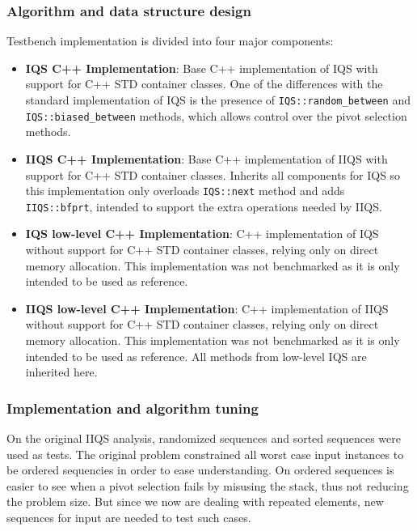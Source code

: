 \subsubsection{Algorithm and data structure design}
Testbench implementation is divided into four major components:

\begin{itemize}
    \item{
        \textbf{IQS C++ Implementation}: Base C++ implementation of IQS with support for C++ STD container classes. One of the differences with the standard implementation of IQS is the presence of \texttt{IQS::random\_between} and \texttt{IQS::biased\_between} methods, which allows control over the pivot selection methods.
    }
    \item{
        \textbf{IIQS C++ Implementation}: Base C++ implementation of IIQS with support for C++ STD container classes. Inherits all components for IQS so this implementation only overloads \texttt{IQS::next} method and adds \texttt{IIQS::bfprt}, intended to support the extra operations needed by IIQS.
    }
    \item{
        \textbf{IQS low-level C++ Implementation}: C++ implementation of IQS without support for C++ STD container classes, relying only on direct memory allocation. This implementation was not benchmarked as it is only intended to be used as reference.
    }
    \item{
        \textbf{IIQS low-level C++ Implementation}: C++ implementation of IIQS without support for C++ STD container classes, relying only on direct memory allocation. This implementation was not benchmarked as it is only intended to be used as reference. All methods from low-level IQS are inherited here.
    }
\end{itemize}

\subsubsection{Implementation and algorithm tuning}
On the original IIQS analysis, randomized sequences and sorted sequences were used as tests. The original problem constrained all worst case input instances to be ordered sequencies in order to ease understanding. On ordered sequences is easier to see when a pivot selection fails by misusing the stack, thus not reducing the problem size. But since we now are dealing with repeated elements, new sequences for input are needed to test such cases.

